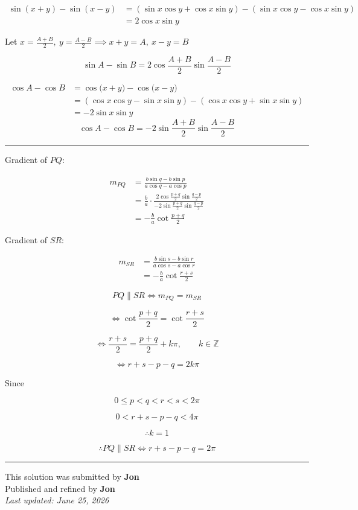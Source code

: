 \documentclass[12pt]{article}
\begin{document}
\newcommand{\ds}{\displaystyle}

\begin{align*}
\sin(x+y)-\sin(x-y)
&=(\sin x\cos y+\cos x\sin y)-(\sin x\cos y-\cos x\sin y)\\
&=2\cos x\sin y
\end{align*}

Let $\ds x=\frac{A+B}{2},\  y=\frac{A-B}{2} \implies x+y=A,\  x-y=B$

$$\sin A-\sin B=2\cos\frac{A+B}{2}\sin\frac{A-B}{2}$$

\begin{align*}
\cos A-\cos B
&=\cos\bigl(x+y\bigr)-\cos\bigl(x-y\bigr)\\
&=(\cos x\cos y-\sin x\sin y)-(\cos x\cos y+\sin x\sin y)\\
&=-2\sin x\sin y
\end{align*}
$$\cos A-\cos B=-2\sin\frac{A+B}{2}\sin\frac{A-B}{2}$$

\bigskip\hrule\bigskip

Gradient of $PQ$:

\begin{align*}
m_{PQ}
&=\frac{b\sin q-b\sin p}{a\cos q-a\cos p}\\
&=\frac{b}{a}\cdot
\frac{2\cos\frac{p+q}{2}\sin\frac{q-p}{2}}
{-2\sin\frac{p+q}{2}\sin\frac{q-p}{2}}\\
&=-\frac ba\cot\frac{p+q}{2}
\end{align*}

Gradient of $SR$:

\begin{align*}
m_{SR}
&=\frac{b\sin s-b\sin r}{a\cos s-a\cos r}\\
&=-\frac ba\cot\frac{r+s}{2}
\end{align*}

$$PQ\parallel SR\iff m_{PQ}=m_{SR}$$

$$\iff \cot\frac{p+q}{2}=\cot\frac{r+s}{2}$$

$$\iff \frac{r+s}{2}=\frac{p+q}{2}+k\pi,\qquad k\in\mathbb Z$$

$$\iff r+s-p-q=2k\pi$$

Since

$$0\leq p<q<r<s<2\pi$$

$$0<r+s-p-q<4\pi$$

$$\therefore k=1$$

$$\therefore PQ\parallel SR\iff r+s-p-q=2\pi$$

\bigskip
\hrule
\begin{center}
    This solution was submitted by \textbf{Jon}\\[4pt]
    Published and refined by \textbf{Jon}\\[8pt]
    \textit{Last updated: June 25, 2026}
\end{center}
\end{document}
